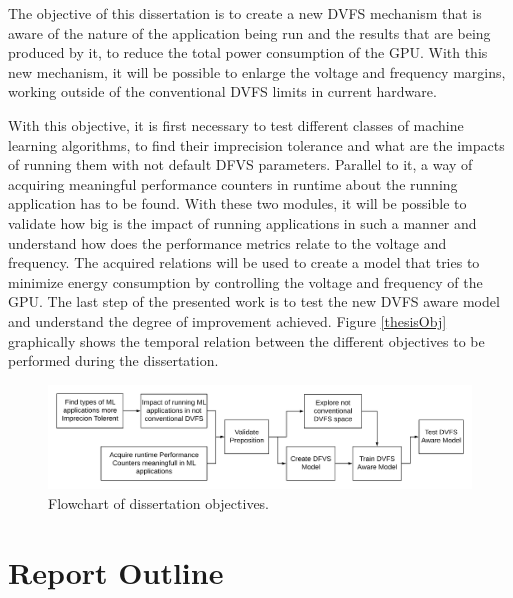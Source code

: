 The objective of this dissertation is to create a new DVFS mechanism that is aware of the nature of the application being run and the results that are being produced by it, to reduce the total power consumption of the GPU. With this new mechanism, it will be possible to enlarge the voltage and frequency margins, working outside of the conventional DVFS limits in current hardware. 

With this objective, it is first necessary to test different classes of machine learning algorithms, to find their imprecision tolerance and what are the impacts of running them with not default DFVS parameters. Parallel to it, a way of acquiring meaningful performance counters in runtime about the running application has to be found. With these two modules, it will be possible to validate how big is the impact of running applications in such a manner and understand how does the performance metrics relate to the voltage and frequency. The acquired relations will be used to create a model that tries to minimize energy consumption by controlling the voltage and frequency of the GPU. The last step of the presented work is to test the new DVFS aware model and understand the degree of improvement achieved. Figure \ref{thesisObj} graphically shows the temporal relation between the different objectives to be performed during the dissertation.

\begin{figure}[!htb]
  \centering
  \includegraphics[width=1\textwidth]{Figures/Introduction/Dissertation_Objectives.png}
  \caption[]{Flowchart of dissertation objectives.}
  \label{fig:thesisObj}
\end{figure}

\section{Report Outline}